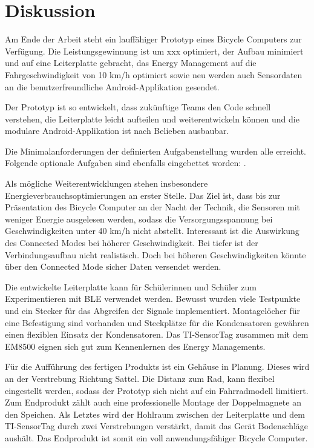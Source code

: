\chapter{Diskussion}

Am Ende der Arbeit steht ein lauffähiger Prototyp eines Bicycle Computers zur Verfügung. Die Leistungsgewinnung ist um xxx  optimiert, der Aufbau minimiert und auf eine Leiterplatte gebracht, das Energy Management auf die Fahrgeschwindigkeit von 10 km/h optimiert sowie neu werden auch Sensordaten an die benutzerfreundliche Android-Applikation gesendet.

Der Prototyp ist so entwickelt, dass zukünftige Teams den Code schnell verstehen, die Leiterplatte leicht aufteilen und weiterentwickeln können und die modulare Android-Applikation ist nach Belieben ausbaubar.

Die Minimalanforderungen der definierten Aufgabenstellung wurden alle erreicht. Folgende optionale Aufgaben sind ebenfalls eingebettet worden: .

Als mögliche Weiterentwicklungen stehen insbesondere Energieverbrauchsoptimierungen an erster Stelle. Das Ziel ist, dass bis zur Präsentation des Bicycle Computer an der Nacht der Technik, die Sensoren mit weniger Energie ausgelesen werden, sodass die Versorgungsspannung bei Geschwindigkeiten unter 40 km/h nicht abstellt. Interessant ist die Auswirkung des Connected Modes bei höherer Geschwindigkeit. Bei tiefer ist der Verbindungsaufbau nicht realistisch. Doch bei höheren Geschwindigkeiten könnte über den Connected Mode sicher Daten versendet werden.

Die entwickelte Leiterplatte kann für Schülerinnen und Schüler zum Experimentieren mit BLE verwendet werden. Bewusst wurden viele Testpunkte und ein Stecker für das Abgreifen der Signale implementiert. Montagelöcher für eine Befestigung sind vorhanden und Steckplätze für die Kondensatoren gewähren einen flexiblen Einsatz der Kondensatoren. Das TI-SensorTag zusammen mit dem EM8500 eignen sich gut zum Kennenlernen des Energy Managements. 

Für die Aufführung des fertigen Produkts ist ein Gehäuse in Planung. Dieses wird an der Verstrebung Richtung Sattel. Die Distanz zum Rad, kann flexibel eingestellt werden, sodass der Prototyp sich nicht auf ein Fahrradmodell limitiert. Zum Endprodukt zählt auch eine professionelle Montage der Doppelmagnete an den Speichen. Als Letztes wird der Hohlraum zwischen der Leiterplatte und dem TI-SensorTag durch zwei Verstrebungen verstärkt, damit das Gerät Bodenschläge aushält. Das Endprodukt ist somit ein voll anwendungsfähiger Bicycle Computer. 

